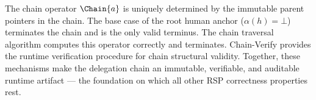 The chain operator $\Chain{a}$ is uniquely determined by the immutable parent pointers in the chain. The base case of the root human anchor ($\alpha(h) = \bot$) terminates the chain and is the only valid terminus. The chain traversal algorithm computes this operator correctly and terminates. Chain-Verify provides the runtime verification procedure for chain structural validity. Together, these mechanisms make the delegation chain an immutable, verifiable, and auditable runtime artifact — the foundation on which all other RSP correctness properties rest.
